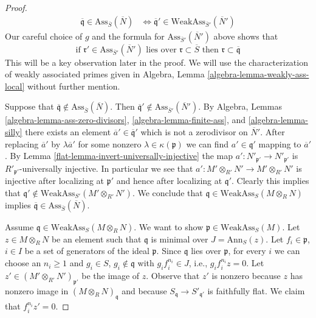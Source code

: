\begin{proof}
\begin{align*}
\overline{\mathfrak q} \in \text{Ass}_{\overline{S}}(\overline{N})
& \Leftrightarrow
\overline{\mathfrak q}' \in \text{WeakAss}_{\overline{S}'}(\overline{N}')
\end{align*}
Our careful choice of $g$ and the formula for
$\text{Ass}_{\overline{S}'}(\overline{N}')$ above shows that
\begin{equation}
\label{equation-key-observation}
\text{if }\mathfrak r' \in \text{Ass}_{\overline{S}'}(\overline{N}')
\text{ lies over }\mathfrak r \subset \overline{S}\text{ then }
\mathfrak r \subset \overline{\mathfrak q}
\end{equation}
This will be a key observation later in the proof. We will use
the characterization of weakly associated primes given in
Algebra, Lemma \ref{algebra-lemma-weakly-ass-local} without further mention.

\medskip\noindent
Suppose that
$\overline{\mathfrak q} \not \in \text{Ass}_{\overline{S}}(\overline{N})$.
Then
$\overline{\mathfrak q}' \not \in \text{Ass}_{\overline{S}'}(\overline{N}')$.
By
Algebra, Lemmas \ref{algebra-lemma-ass-zero-divisors},
\ref{algebra-lemma-finite-ass}, and
\ref{algebra-lemma-silly}
there exists an element $\overline{a}' \in \overline{\mathfrak q}'$
which is not a zerodivisor on $\overline{N}'$.
After replacing $\overline{a}'$ by $\lambda \overline{a}'$ for some nonzero
$\lambda \in \kappa(\mathfrak p)$ we can find
$a' \in \mathfrak q'$ mapping to $\overline{a}'$. By
Lemma \ref{flat-lemma-invert-universally-injective}
the map $a' : N'_{\mathfrak p'} \to N'_{\mathfrak p'}$ is
$R'_{\mathfrak p'}$-universally injective. In particular
we see that $a' : M' \otimes_{R'} N' \to M' \otimes_{R'} N'$ is
injective after localizing at $\mathfrak p'$ and hence after
localizing at $\mathfrak q'$. Clearly this implies that
$\mathfrak q' \not \in \text{WeakAss}_{S'}(M' \otimes_{R'} N')$.
We conclude that $\mathfrak q \in \text{WeakAss}_S(M \otimes_R N)$ implies
$\overline{\mathfrak q} \in \text{Ass}_{\overline{S}}(\overline{N})$.

\medskip\noindent
Assume $\mathfrak q \in \text{WeakAss}_S(M \otimes_R N)$. We want
to show $\mathfrak p \in \text{WeakAss}_S(M)$.
Let $z \in M \otimes_R N$ be an element such that $\mathfrak q$
is minimal over $J = \text{Ann}_S(z)$.
Let $f_i \in \mathfrak p$, $i \in I$ be a set of generators of the
ideal $\mathfrak p$. Since $\mathfrak q$ lies over $\mathfrak p$, for every $i$
we can choose an $n_i \geq 1$ and $g_i \in S$, $g_i \not \in \mathfrak q$
with $g_i f_i^{n_i} \in J$, i.e., $g_i f_i^{n_i} z = 0$.
Let $z' \in (M' \otimes_{R'} N')_{\mathfrak p'}$ be the image of $z$.
Observe that $z'$ is nonzero because $z$ has nonzero image in
$(M \otimes_R N)_\mathfrak q$ and because $S_\mathfrak q \to S'_{\mathfrak q'}$
is faithfully flat. We claim that $f_i^{n_i} z' = 0$.


\end{proof}
